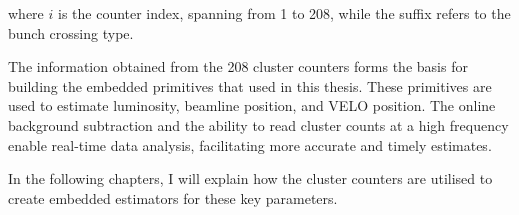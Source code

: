 where $i$ is the counter index, spanning from 1 to 208, while the suffix refers to the bunch crossing type.

The information obtained from the 208 cluster counters forms the basis for building the embedded primitives that used in this thesis. These primitives are used to estimate luminosity, beamline position, and VELO position. The online background subtraction and the ability to read cluster counts at a high frequency enable real-time data analysis, facilitating more accurate and timely estimates.

In the following chapters, I will explain how the cluster counters are utilised to create embedded estimators for these key parameters. 
